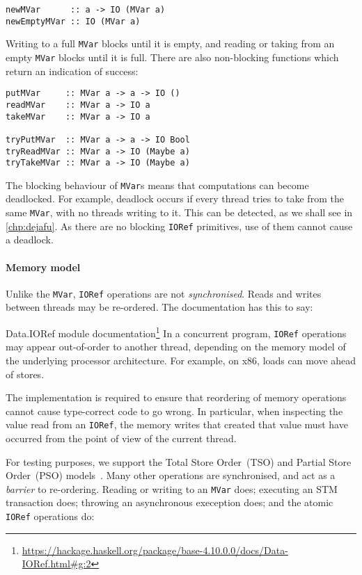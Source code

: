 \begin{verbatim}
newMVar      :: a -> IO (MVar a)
newEmptyMVar :: IO (MVar a)
\end{verbatim}

Writing to a full \verb|MVar| blocks until it is empty, and reading or taking
from an empty \verb|MVar| blocks until it is full.  There are also non-blocking
functions which return an indication of success:

\begin{verbatim}
putMVar     :: MVar a -> a -> IO ()
readMVar    :: MVar a -> IO a
takeMVar    :: MVar a -> IO a

tryPutMVar  :: MVar a -> a -> IO Bool
tryReadMVar :: MVar a -> IO (Maybe a)
tryTakeMVar :: MVar a -> IO (Maybe a)
\end{verbatim}

The blocking behaviour of \verb|MVar|s means that computations can
become deadlocked.  For example, deadlock occurs if every thread tries
to take from the same \verb|MVar|, with no threads writing to it.
This can be detected, as we shall see in \cref{chp:dejafu}.  As there
are no blocking \verb|IORef| primitives, use of them cannot cause a
deadlock.

\paragraph{Memory model}
Unlike the \verb|MVar|, \verb|IORef| operations are not
\emph{synchronised}.  Reads and writes between threads may be
re-ordered.  The documentation has this to say:

\begin{bquote}{Data.IORef module documentation\footnote{\url{https://hackage.haskell.org/package/base-4.10.0.0/docs/Data-IORef.html\#g:2}}}
  In a concurrent program, \verb|IORef| operations may appear out-of-order to
  another thread, depending on the memory model of the underlying processor
  architecture.  For example, on x86, loads can move ahead of stores.

  The implementation is required to ensure that reordering of memory operations
  cannot cause type-correct code to go wrong.  In particular, when inspecting
  the value read from an \verb|IORef|, the memory writes that created that value
  must have occurred from the point of view of the current thread.
\end{bquote}

For testing purposes, we support the Total Store Order~(TSO) and Partial Store
Order~(PSO) models~.  Many other operations are
synchronised, and act as a \emph{barrier} to re-ordering.  Reading or writing to
an \verb|MVar| does; executing an STM transaction does; throwing an asynchronous
exeception does; and the atomic \verb|IORef| operations do:

